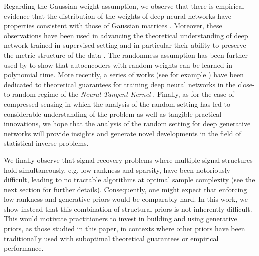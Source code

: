 Regarding the Gaussian weight assumption, we observe that there is empirical evidence that the distribution of the weights of deep neural networks have properties consistent with those of Gaussian matrices \citep{arora2015deep}. Moreover, these observations have been used in advancing the theoretical understanding of deep network trained in supervised setting and in particular their ability to preserve the metric structure of the data \citep{giryes2016deep}. The randomness 
assumption has been further used by \citep{arora2014provable} to show that autoencoders with random weights can be learned in polynomial time. 
More recently, a series of works (see for example \citep{li2018learning, du2018gradient, oymak2019towards, mei2019generalization, chizat2019lazy}) have been dedicated to theoretical guarantees for training deep neural networks in the close-to-random regime of the \textit{Neural Tangent Kernel} \citep{jacot2018neural}. 
Finally, as for the case of compressed sensing in which the analysis of the random setting has led to considerable understanding 
of the problem as well as tangible practical innovations, we hope that the analysis of the random setting for deep generative networks will provide 
insights and generate novel developments in the field of statistical inverse problems. 



We finally observe that signal recovery problems where multiple signal structures hold simultaneously,
e.g. low-rankness and sparsity, have been notoriously difficult, leading to no tractable algorithms at optimal sample complexity (see the next section for further details). Consequently, one might expect that enforcing low-rankness and generative priors would be comparably hard. In this work, we show instead that this combination of structural priors is not inherently difficult. 
This would motivate practitioners to invest in building and using generative priors, as those studied in this paper, in contexts where other priors have been traditionally used with suboptimal theoretical guarantees or empirical performance. 